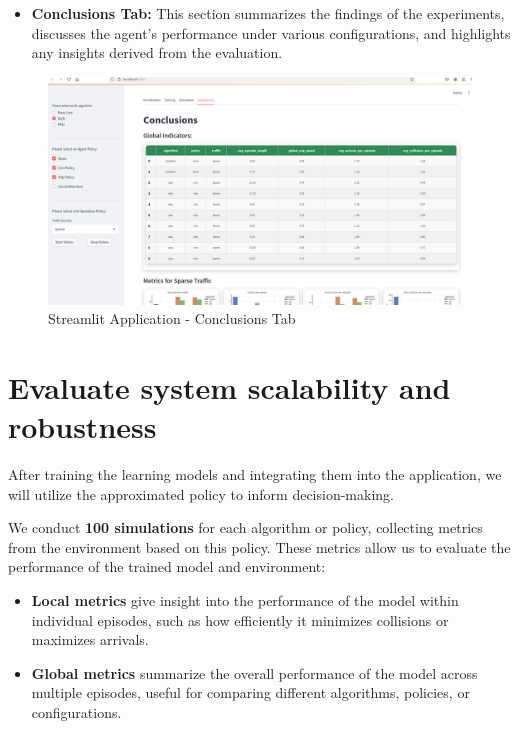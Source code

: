 \begin{itemize}
    \item \textbf{Conclusions Tab:} 
    This section summarizes the findings of the experiments, discusses the agent's performance under various configurations, and highlights any insights derived from the evaluation.
\end{itemize}

\begin{figure}[H]
    \centering
    \includegraphics[height=0.35\textheight]{images/app_conclusions.png} 
    \caption{Streamlit Application - Conclusions Tab}
\end{figure}

\newpage

\section{Evaluate system scalability and robustness}

After training the learning models and integrating them into the application, we will utilize the approximated policy to inform decision-making. 

We conduct \textbf{100 simulations} for each algorithm or policy, collecting metrics from the environment based on this policy. 
These metrics allow us to evaluate the performance of the trained model and environment:
\begin{itemize}
    \item \textbf{Local metrics} give insight into the performance of the model within individual episodes, such as how efficiently it minimizes collisions or maximizes arrivals.
    \item \textbf{Global metrics} summarize the overall performance of the model across multiple episodes, useful for comparing different algorithms, policies, or configurations.
\end{itemize}

